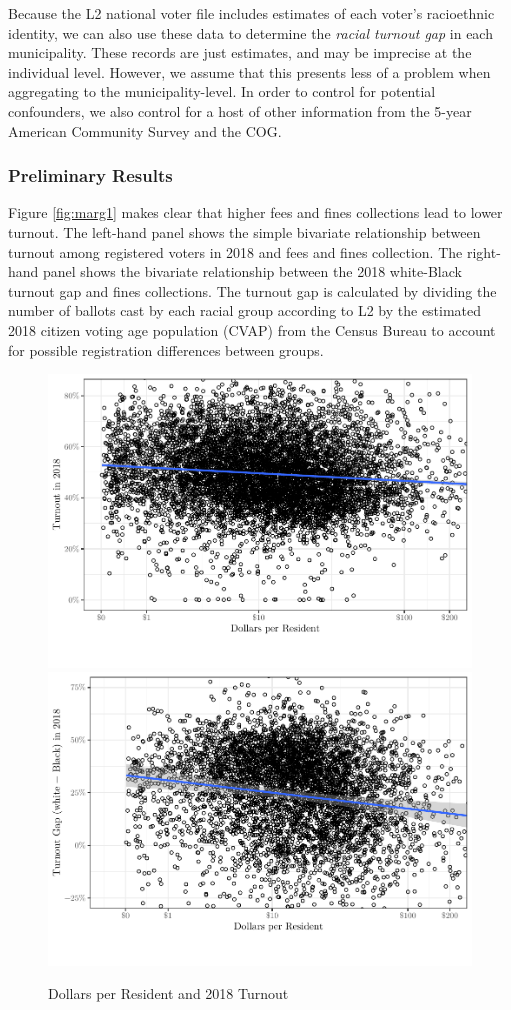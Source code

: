\documentclass[
  12pt,
]{article}
\begin{document}
Because the L2 national voter file includes estimates of each voter's racioethnic identity, we can also use these data to determine the \emph{racial turnout gap} in each municipality. These records are just estimates, and may be imprecise at the individual level. However, we assume that this presents less of a problem when aggregating to the municipality-level. In order to control for potential confounders, we also control for a host of other information from the 5-year American Community Survey and the COG.

\hypertarget{preliminary-results}{%
\subsubsection*{Preliminary Results}\label{preliminary-results}}

Figure \ref{fig:marg1} makes clear that higher fees and fines collections lead to lower turnout. The left-hand panel shows the simple bivariate relationship between turnout among registered voters in 2018 and fees and fines collection. The right-hand panel shows the bivariate relationship between the 2018 white-Black turnout gap and fines collections. The turnout gap is calculated by dividing the number of ballots cast by each racial group according to L2 by the estimated 2018 citizen voting age population (CVAP) from the Census Bureau to account for possible registration differences between groups.

\begin{figure}[H]
\includegraphics[width=0.5\linewidth]{fees_fines_to_files/figure-latex/figures-side-1} \includegraphics[width=0.5\linewidth]{fees_fines_to_files/figure-latex/figures-side-2} \caption{\label{fig:marg1}Dollars per Resident and 2018 Turnout}\label{fig:figures-side}
\end{figure}
\end{document}

